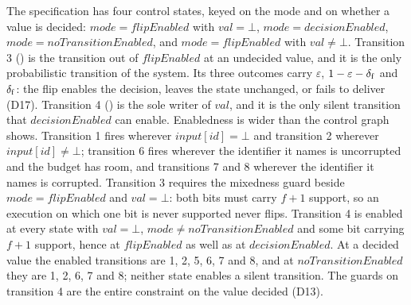 The specification has four control states, keyed on the mode and on whether a value is decided: $mode = flipEnabled$ with $val = \bot$, $mode = decisionEnabled$, $mode = noTransitionEnabled$, and $mode = flipEnabled$ with $val \neq \bot$.
Transition 3 () is the transition out of $flipEnabled$ at an undecided value, and it is the only probabilistic transition of the system.
Its three outcomes carry $\varepsilon$, $1-\varepsilon-\delta_{\mathrm{f}}$ and $\delta_{\mathrm{f}}$: the flip enables the decision, leaves the state unchanged, or fails to deliver (D17).
Transition 4 () is the sole writer of $val$, and it is the only silent transition that $decisionEnabled$ can enable.
Enabledness is wider than the control graph shows.
Transition 1 fires wherever $input[id] = \bot$ and transition 2 wherever $input[id] \neq \bot$; transition 6 fires wherever the identifier it names is uncorrupted and the budget has room, and transitions 7 and 8 wherever the identifier it names is corrupted.
Transition 3 requires the mixedness guard beside $mode = flipEnabled$ and $val = \bot$: both bits must carry $f{+}1$ support, so an execution on which one bit is never supported never flips.
Transition 4 is enabled at every state with $val = \bot$, $mode \neq noTransitionEnabled$ and some bit carrying $f{+}1$ support, hence at $flipEnabled$ as well as at $decisionEnabled$.
At a decided value the enabled transitions are 1, 2, 5, 6, 7 and 8, and at $noTransitionEnabled$ they are 1, 2, 6, 7 and 8; neither state enables a silent transition.
The guards on transition 4 are the entire constraint on the value decided (D13).



